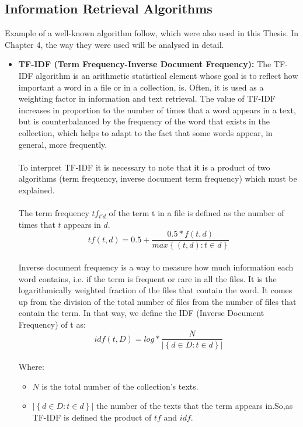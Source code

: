 \subsection{Information Retrieval Algorithms}\label{231_ref}
Example of a well-known algorithm follow, which were also used in this Thesis. In Chapter 4, the way they were used will be analysed in detail.\\
\begin{itemize}

	\item \textbf{TF-IDF (Term Frequency-Inverse Document Frequency):} The TF-IDF algorithm is an arithmetic statistical element whose goal is to reflect how important a word in a file or in a collection, is. Often, it is used as a weighting factor in information and text retrieval. The value of TF-IDF increases in proportion to the number of times that a word appears in a text, but is counterbalanced by the frequency of the word that exists in the collection, which helps to adapt to the fact that some words appear, in general, more frequently.\\
\\
To interpret TF-IDF it is necessary to note that it is a product of two algorithms (term frequency, inverse document term frequency) which must be explained.\\
\\
The term frequency $tf_{t'd}$ of the term t in a file is defined as the number of times that $t$ appears in $d$. 
\\
\begin{equation}
tf\left(t,d\right)=0.5+\frac{0.5*f\left(t,d\right)}{max\left\lbrace\left(t,d\right):t \in d\right\rbrace}
\end{equation}
\\
Inverse document frequency is a way to measure how much information each word contains, i.e. if the term is frequent or rare in all the files. It is the logarithmically weighted fraction of the files that contain the word. It comes up from the division of the total number of files from the number of files that contain the term. In that way, we define the IDF (Inverse Document Frequency) of t as:
\\
\begin{equation}
idf\left(t,D\right)=log*\frac{N}{|\left\lbrace d \in D :t \in d\right\rbrace|}
\end{equation}
\\
Where:\\
\begin{itemize}

	\item $N$ is the total number of the collection's texts.
	\item $|\left\lbrace d \in D :t \in d\right\rbrace|$ the number of the texts that the term appears in.So,as TF-IDF is defined the product of $tf$ and $idf$.

\end{itemize}

\end{itemize}
